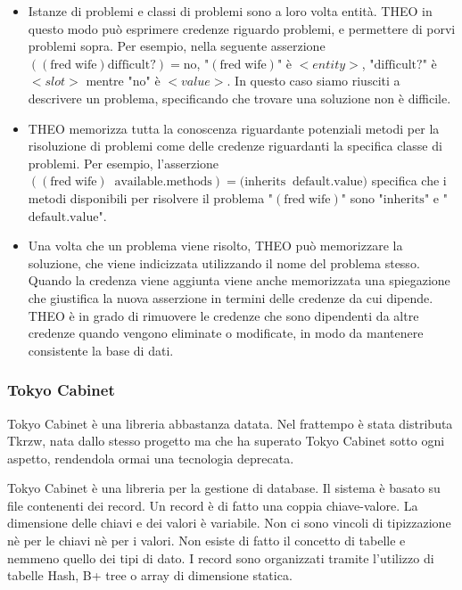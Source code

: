 \begin{itemize}
\begin{itemize}
\end{itemize}
\item Istanze di problemi e classi di problemi sono a loro volta entità. THEO in questo modo può esprimere credenze riguardo problemi, e permettere di porvi problemi sopra. Per esempio, nella seguente asserzione  $((\textrm{fred}\; \textrm{wife}) \textrm{difficult?}) = \textrm{no}$, "$(\textrm{fred}\; \textrm{wife})$" è $<entity>$, "$\textrm{difficult?}$" è $<slot>$ mentre "$\textrm{no}$" è $<value>$. In questo caso siamo riusciti a descrivere un problema, specificando che trovare una soluzione non è difficile.
\item THEO memorizza tutta la conoscenza riguardante potenziali metodi per la risoluzione di problemi come delle credenze riguardanti la specifica classe di problemi. Per esempio, l'asserzione $((\textrm{fred}\;\textrm{wife})\;\; \textrm{available.methods}) = (\textrm{inherits}\;\;\textrm{default.value)}$ specifica che i metodi disponibili per risolvere il problema "$(\textrm{fred}\; \textrm{wife})$" sono "$\textrm{inherits}$" e "$\textrm{default.value}$".
\item Una volta che un problema viene risolto, THEO può memorizzare la soluzione, che viene indicizzata utilizzando il nome del problema stesso. Quando la credenza viene aggiunta viene anche memorizzata una spiegazione che giustifica la nuova asserzione in termini delle credenze da cui dipende. THEO è in grado di rimuovere le credenze che sono dipendenti da altre credenze quando vengono eliminate o modificate, in modo da mantenere consistente la base di dati\cite{theofram80:online}.
\end{itemize}
\subsubsection{Tokyo Cabinet}

\begin{warn}
	Tokyo Cabinet è una libreria abbastanza datata. Nel frattempo è stata distributa Tkrzw, nata dallo stesso progetto ma che ha superato Tokyo Cabinet sotto ogni aspetto, rendendola ormai una tecnologia deprecata.
\end{warn}

\noindent Tokyo Cabinet è una libreria per la gestione di database. Il sistema è basato su file contenenti dei record. Un record è di fatto una coppia chiave-valore. La dimensione delle chiavi e dei valori è variabile. Non ci sono vincoli di tipizzazione nè per le chiavi nè per i valori. Non esiste di fatto il concetto di tabelle e nemmeno quello dei tipi di dato. I record sono organizzati tramite l'utilizzo di tabelle Hash, B+ tree o array di dimensione statica.

